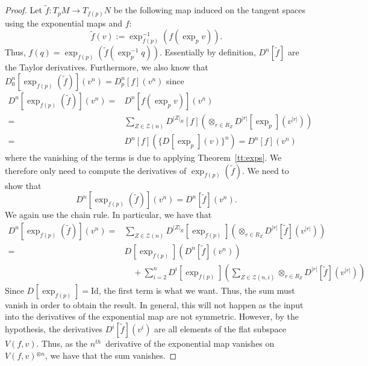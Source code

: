 \documentclass[11pt]{article}
\theoremstyle{remark}
\begin{document}
\begin{proof}
Let $\ensuremath{\tilde{f}}: T_pM \to T_{f(p)}N$ be the following 
map induced on the tangent spaces using the exponential
maps and $f$:
 \[\ensuremath{\tilde{f}}(v) \ensuremath{:=} \ensuremath{\exp^{-1}_{f(p)}{(f(\ensuremath{\exp_{p}{v}}))}}.\] 
Thus, $f(q) = \ensuremath{\exp_{f(p)}{(\ensuremath{\tilde{f}}(\ensuremath{\exp^{-1}_{p}{q}}))}}$. 
Essentially by definition, $\ensuremath{D^{n} [{\ensuremath{\tilde{f}}}] {} }$ 
are the Taylor derivatives. Furthermore,
we also know that $\ensuremath{D_{0}^{n} {[\ensuremath{\exp_{f(p)}{(\ensuremath{\tilde{f}})}}]} ({v^n}) } =
\ensuremath{D_{p}^{n} {[f]} ({v^n}) }$ 
since  
\begin{align*}
\ensuremath{D^{n} [{\ensuremath{\exp_{f(p)}{(\ensuremath{\tilde{f}})}}}] ({v^n}) } =& \ensuremath{D^{n} [{f(\ensuremath{\exp_{p}{v}})}] ({v^n}) } 
\\ =&\sum_{\ensuremath{Z} \in \ensuremath{\mathcal{\ensuremath{Z}}}(n)} 
\ensuremath{D^{|\ensuremath{Z}|_R} [{f}] ({\mathop{\otimes}_{r \in R_{\ensuremath{Z}}} \ensuremath{D^{|r|} [{\ensuremath{\exp_{p}{}}}] ({
v^{|r|}}) }}) } \\
 = & \ensuremath{D^{n} [{f}] ({\{\ensuremath{D^{} [{\ensuremath{\exp_{p}{}}}] ({v}) }\}^{n}}) } = \ensuremath{D^{n} [{f}] ({v^{n}}) }
\end{align*}
where the vanishing of the terms is due to applying
Theorem~\ref{tt:exps}.
We therefore only need to compute the derivatives of $\ensuremath{\exp_{f(p)}{(\ensuremath{\tilde{f}})}}$.
We need to show that
\[
\ensuremath{D^{n} [{\ensuremath{\exp_{f(p)}{(\ensuremath{\tilde{f}})}}}] ({v^n}) }= \ensuremath{D^{n} [{\ensuremath{\tilde{f}}}] ({v^n}) }.
\]
We again use the chain rule. In particular, we have that 
\begin{align*}
\ensuremath{D^{n} [{\ensuremath{\exp_{f(p)}{(\ensuremath{\tilde{f}})}}}] ({v^n}) }  = & 
\sum_{\ensuremath{Z} \in \ensuremath{\mathcal{\ensuremath{Z}}}(n)} 
\ensuremath{D^{|\ensuremath{Z}|_R} [{\ensuremath{\exp_{f(p)}{}}}] ({\mathop{\otimes}_{r \in R_{\ensuremath{Z}}} \ensuremath{D^{|r|} [{\ensuremath{\tilde{f}}}] ({
v^{|r|}}) }}) } \\
= &  \ensuremath{D^{} [{\ensuremath{\exp_{f(p)}{}}}] ({ \ensuremath{D^{n} [{\ensuremath{\tilde{f}}}] ({v^n}) }}) }  \\
&\quad + \sum_{i=2}^{n} \ensuremath{D^{i} [{\ensuremath{\exp_{f(p)}{}}}] ({\sum_{\ensuremath{Z} \in \ensuremath{\mathcal{\ensuremath{Z}}}(n,i)}
{\mathop{\otimes}_{r \in R_{\ensuremath{Z}}} \ensuremath{D^{|r|} [{\ensuremath{\tilde{f}}}] ({ v^{|r|}}) }}}) }
\end{align*}
Since $\ensuremath{D^{} [{\ensuremath{\exp_{f(p)}{}}}] {} } = \ensuremath{\text{Id}}$, the first term is what we want.
Thus, the sum must
vanish in order to obtain the result. 
In general, this will not happen as the input into the derivatives of
the exponential map are not symmetric. 
However, by
the hypothesis, the
derivatives  $\ensuremath{D^{i} [{\ensuremath{\tilde{f}}}] ({v^{i}}) }$ are all elements of the flat
subspace $V(f,v)$. Thus, as the \ensuremath{{n}^{th}}\ derivative of the exponential map
vanishes on $V(f,v)\ensuremath{^{\otimes n} }$, we have that the sum vanishes.   
\end{proof}
\end{document}
